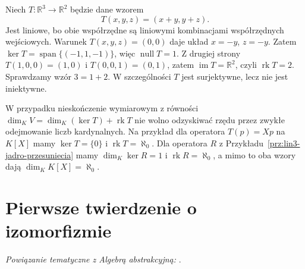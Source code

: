 \begin{przyklad}
\label{prz:lin3-rzad-r3}
Niech \(T\colon\mathbb R^3\to\mathbb R^2\)
będzie dane wzorem
\[
 T(x,y,z)=(x+y,y+z).
\]
Jest liniowe, bo obie współrzędne są liniowymi
kombinacjami współrzędnych wejściowych.
Warunek \(T(x,y,z)=(0,0)\) daje układ
\(x=-y\), \(z=-y\). Zatem
\(\ker T=\operatorname{span}\{(-1,1,-1)\}\),
więc \(\operatorname{null}T=1\).
Z drugiej strony \(T(1,0,0)=(1,0)\)
i \(T(0,0,1)=(0,1)\), zatem
\(\operatorname{im}T=\mathbb R^2\),
czyli \(\operatorname{rk}T=2\).
Sprawdzamy wzór \(3=1+2\).
W szczególności \(T\) jest surjektywne,
lecz nie jest iniektywne.
\end{przyklad}

\begin{uwaga}
\label{rem:lin3-rzad-nieskonczony}
W przypadku nieskończenie wymiarowym
z równości
\(\dim_KV=\dim_K(\ker T)+\operatorname{rk}T\)
nie wolno odzyskiwać rzędu przez zwykłe
odejmowanie liczb kardynalnych.
Na przykład dla operatora \(T(p)=Xp\)
na \(K[X]\) mamy \(\ker T=\{0\}\)
i \(\operatorname{rk}T=\aleph_0\).
Dla operatora \(R\) z
Przykładu~\ref{prz:lin3-jadro-przesuniecia}
mamy \(\dim_K\ker R=1\)
i \(\operatorname{rk}R=\aleph_0\),
a mimo to oba wzory dają
\(\dim_KK[X]=\aleph_0\).
\end{uwaga}

\section{Pierwsze twierdzenie o izomorfizmie}
\label{sec:lin3-izomorfizm}

\noindent\emph{Powiązanie tematyczne z Algebrą abstrakcyjną:} .


